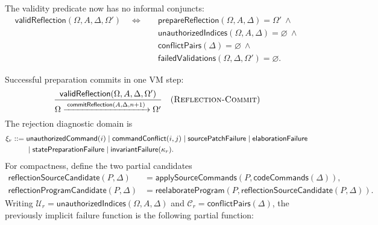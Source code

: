 The validity predicate now has no informal conjuncts:
\begin{equation}\label{eq:reflection-validity}
\begin{aligned}
 \mathsf{validReflection}(\Omega,A,\Delta,\Omega')
 \quad\Longleftrightarrow\quad{}
 &\mathsf{prepareReflection}(\Omega,A,\Delta)=\Omega'\ \land\\
 &\mathsf{unauthorizedIndices}(\Omega,A,\Delta)=\varnothing\ \land\\
 &\mathsf{conflictPairs}(\Delta)=\varnothing\ \land\\
 &\mathsf{failedValidations}(\Omega,\Delta,\Omega')=\varnothing.
\end{aligned}
\end{equation}

Successful preparation commits in one VM step:
\[
\dfrac{\mathsf{validReflection}(\Omega,A,\Delta,\Omega')}
 {\Omega\xrightarrow{\;\mathsf{commitReflection}(A,\Delta,n+1)\;}\Omega'}
\quad(\textsc{Reflection-Commit})
\]
The rejection diagnostic domain is
\begin{equation}\label{eq:reflection-failure-domain}
\begin{aligned}
 \xi_r::={}&\mathsf{unauthorizedCommand}(i)
 \mid\mathsf{commandConflict}(i,j)
 \mid\mathsf{sourcePatchFailure}\mid\mathsf{elaborationFailure}\\
 &\mid\mathsf{statePreparationFailure}\mid\mathsf{invariantFailure}(\kappa_r).
\end{aligned}
\end{equation}
For compactness, define the two partial candidates
\begin{equation}\label{eq:reflection-diagnostic-candidates}
\begin{aligned}
 \mathsf{reflectionSourceCandidate}(P,\Delta)
  &=\mathsf{applySourceCommands}(P,\mathsf{codeCommands}(\Delta)),\\
 \mathsf{reflectionProgramCandidate}(P,\Delta)
  &=\mathsf{reelaborateProgram}
      (P,\mathsf{reflectionSourceCandidate}(P,\Delta)).
\end{aligned}
\end{equation}
Writing
$\mathcal U_r=\mathsf{unauthorizedIndices}(\Omega,A,\Delta)$ and
$\mathcal C_r=\mathsf{conflictPairs}(\Delta)$, the previously implicit failure
function is the following partial function:
